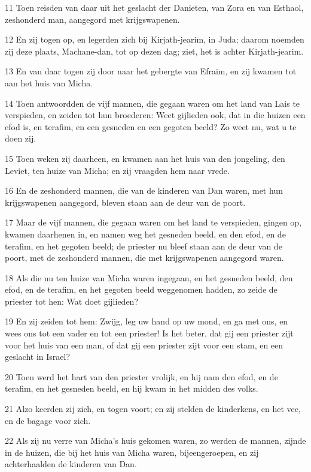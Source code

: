 \par 11 Toen reisden van daar uit het geslacht der Danieten, van Zora en van Esthaol, zeshonderd man, aangegord met krijgswapenen.
\par 12 En zij togen op, en legerden zich bij Kirjath-jearim, in Juda; daarom noemden zij deze plaats, Machane-dan, tot op dezen dag; ziet, het is achter Kirjath-jearim.
\par 13 En van daar togen zij door naar het gebergte van Efraim, en zij kwamen tot aan het huis van Micha.
\par 14 Toen antwoordden de vijf mannen, die gegaan waren om het land van Lais te verspieden, en zeiden tot hun broederen: Weet gijlieden ook, dat in die huizen een efod is, en terafim, en een gesneden en een gegoten beeld? Zo weet nu, wat u te doen zij.
\par 15 Toen weken zij daarheen, en kwamen aan het huis van den jongeling, den Leviet, ten huize van Micha; en zij vraagden hem naar vrede.
\par 16 En de zeshonderd mannen, die van de kinderen van Dan waren, met hun krijgswapenen aangegord, bleven staan aan de deur van de poort.
\par 17 Maar de vijf mannen, die gegaan waren om het land te verspieden, gingen op, kwamen daarhenen in, en namen weg het gesneden beeld, en den efod, en de terafim, en het gegoten beeld; de priester nu bleef staan aan de deur van de poort, met de zeshonderd mannen, die met krijgswapenen aangegord waren.
\par 18 Als die nu ten huize van Micha waren ingegaan, en het gesneden beeld, den efod, en de terafim, en het gegoten beeld weggenomen hadden, zo zeide de priester tot hen: Wat doet gijlieden?
\par 19 En zij zeiden tot hem: Zwijg, leg uw hand op uw mond, en ga met ons, en wees ons tot een vader en tot een priester! Is het beter, dat gij een priester zijt voor het huis van een man, of dat gij een priester zijt voor een stam, en een geslacht in Israel?
\par 20 Toen werd het hart van den priester vrolijk, en hij nam den efod, en de terafim, en het gesneden beeld, en hij kwam in het midden des volks.
\par 21 Alzo keerden zij zich, en togen voort; en zij stelden de kinderkens, en het vee, en de bagage voor zich.
\par 22 Als zij nu verre van Micha's huis gekomen waren, zo werden de mannen, zijnde in de huizen, die bij het huis van Micha waren, bijeengeroepen, en zij achterhaalden de kinderen van Dan.

